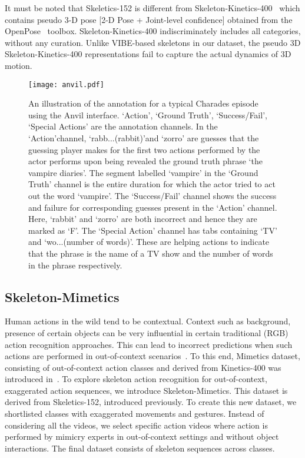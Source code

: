 \documentclass[twocolumn]{svjour3}          \smartqed  \usepackage{graphicx}
\begin{document}
It must be noted that Skeletics-152 is different from  Skeleton-Kinetics-400~\cite{stgcn2018aaai} which contains pseudo 3-D pose [2-D Pose + Joint-level confidence] obtained from the OpenPose~\cite{cao2018openpose} toolbox. Skeleton-Kinetics-400 indiscriminately includes all categories, without any curation. Unlike VIBE-based skeletons in our dataset, the pseudo 3D Skeleton-Kinetics-400 representations fail to capture the actual dynamics of 3D motion. 

\begin{figure*}[!ht]
\centering
\texttt{[image: anvil.pdf]}
\caption{An illustration of the annotation for a typical Charades episode using the Anvil interface. `Action', `Ground Truth', `Success/Fail', `Special Actions' are the annotation channels. In the `Action'channel, `rabb...(rabbit)'and `zorro' are guesses that the guessing player makes for the first two actions performed by the actor performs upon being revealed the ground truth  phrase `the vampire diaries'. The segment labelled `vampire'  in the `Ground Truth' channel is the entire duration for which the actor tried to act out the word `vampire'. The `Success/Fail'  channel shows the success and failure for corresponding guesses present in the `Action' channel. Here, `rabbit' and `zorro' are both incorrect and hence they are marked as `F'. The `Special Action' channel has tabs containing `TV' and `wo...(number of words)'. These are helping actions to indicate that the phrase is the name of a TV show and the number of words in the phrase respectively.}
\label{fig:anvil}
\end{figure*}


\subsection{Skeleton-Mimetics}
\label{sec:mimeticsintro}

Human actions in the wild tend to be contextual. Context such as background, presence of certain objects can be very influential in certain traditional (RGB) action recognition approaches. This can lead to incorrect predictions when such actions are performed in out-of-context scenarios~\cite{weinzaepfel2019mimetics}. To this end, Mimetics dataset, consisting of  out-of-context action classes and derived from Kinetics-400 was introduced in~\cite{weinzaepfel2019mimetics}. To explore  skeleton action recognition for out-of-context, exaggerated action sequences, we introduce Skeleton-Mimetics. This dataset is derived from Skeletics-152, introduced previously. To create this new dataset, we shortlisted classes with exaggerated movements and gestures. Instead of considering all the videos, we select specific action videos where action is performed by mimicry experts in out-of-context settings and without object interactions. The final dataset consists of  skeleton sequences across  classes.
\end{document}
